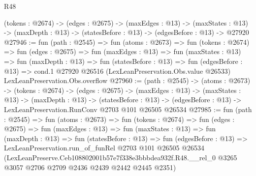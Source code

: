 \begin{lexlean}{R48}
\begin{coremodule}
  (tokens : @2674) ->
  (edges : @2675) ->
  (maxEdges : @13) ->
  (maxStates : @13) -> (maxDepth : @13) -> (statesBefore : @13) -> (edgesBefore : @13) -> @27920
@27946 := fun (path : @2545) =>
  fun (atoms : @2673) =>
  fun (tokens : @2674) =>
  fun (edges : @2675) =>
  fun (maxEdges : @13) =>
  fun (maxStates : @13) =>
  fun (maxDepth : @13) =>
  fun (statesBefore : @13) =>
  fun (edgesBefore : @13) =>
  cond.{1} @27920 @26516 (LexLeanPreservation.Obs.value @26533) LexLeanPreservation.Obs.overflow
@27960 := (path : @2545) ->
  (atoms : @2673) ->
  (tokens : @2674) ->
  (edges : @2675) ->
  (maxEdges : @13) ->
  (maxStates : @13) ->
  (maxDepth : @13) ->
  (statesBefore : @13) ->
  (edgesBefore : @13) -> LexLeanPreservation.RunConv @2703 @101 @26505 @26534
@27985 := fun (path : @2545) =>
  fun (atoms : @2673) =>
  fun (tokens : @2674) =>
  fun (edges : @2675) =>
  fun (maxEdges : @13) =>
  fun (maxStates : @13) =>
  fun (maxDepth : @13) =>
  fun (statesBefore : @13) =>
  fun (edgesBefore : @13) =>
  LexLeanPreservation.run_of_funRel
    @2703
    @101
    @26505
    @26534
    (LexLeanPreserve.Ceb108802001b57e7f338e3bbbdea932f.R48.__rel_0
      @3265
      @3057
      @2706
      @2709
      @2436
      @2439
      @2442
      @2445
      @2351)
\end{coremodule}
\end{lexlean}
